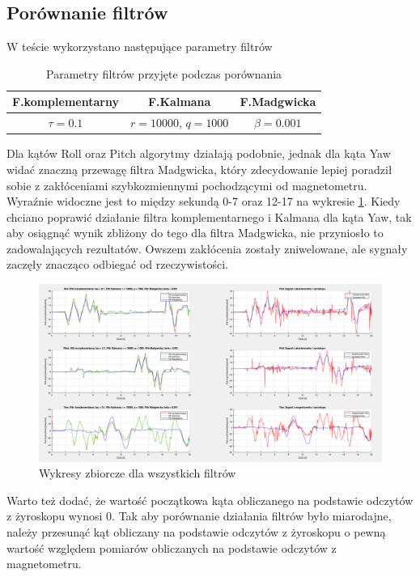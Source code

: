 \subsection{Porównanie filtrów}

W teście wykorzystano następujące parametry filtrów
\begin{table}[h!]
    \centering
    \begin{tabular}{|c|c|c|}
        \hline
        F.komplementarny & F.Kalmana & F.Madgwicka \\
        \hline
        $\tau = 0.1$ & $r = 10000$, $q = 1000$ & $\beta = 0.001$ \\
        \hline
    \end{tabular}
    
     \caption{Parametry filtrów przyjęte podczas porównania}
\end{table}

Dla kątów Roll oraz Pitch algorytmy działają podobnie, jednak dla kąta Yaw widać znaczną przewagę filtra Madgwicka, który zdecydowanie lepiej poradził sobie z zakłóceniami szybkozmiennymi pochodzącymi od magnetometru. Wyraźnie widoczne jest to między sekundą 0-7 oraz 12-17 na wykresie \ref{Porownanie}. Kiedy chciano poprawić działanie filtra komplementarnego i Kalmana dla kąta Yaw, tak aby osiągnąć wynik zbliżony do tego dla filtra Madgwicka, nie przyniosło to zadowalających rezultatów. Owszem zakłócenia zostały zniwelowane, ale sygnały zaczęły znacząco odbiegać od rzeczywistości. 

\begin{figure}[h!]
    \centering
    \includegraphics[width=1\textwidth]{Rysunki/Rozdzial04/Porownanie.png}
    \caption{Wykresy zbiorcze dla wszystkich filtrów}
    \label{Porownanie}
\end{figure}

Warto też dodać, że wartość początkowa kąta obliczanego na podstawie odczytów z żyroskopu wynosi 0. Tak aby porównanie działania filtrów było miarodajne, należy przesunąć kąt obliczany na podstawie odczytów z żyroskopu o pewną wartość względem pomiarów obliczanych na podstawie odczytów z magnetometru.